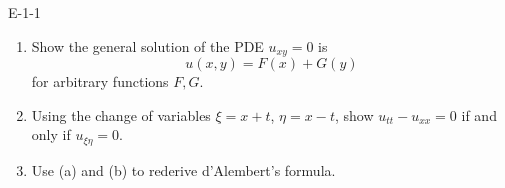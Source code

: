 \documentclass{article}
\begin{document}
	\begin{prb}{E-1-1}
		$ $\newline \vspace{-0.25cm}
		\begin{enumerate}[itemsep =-2pt,label = (\alph{*})]
			\item Show the general solution of the PDE $u_{xy} = 0$ is 
			\begin{equation*}
				u(x, y) = F(x) + G(y) 
			\end{equation*}
			for arbitrary functions $F, G$. 
			\item Using the change of variables $\xi = x + t$, $\eta = x - t$, show $u_{tt} - u_{xx} = 0$ if and only if $u_{\xi\eta} = 0$. 
			\item Use (a) and (b) to rederive d'Alembert's formula. 
		\end{enumerate}
	\end{prb}
\end{document}
